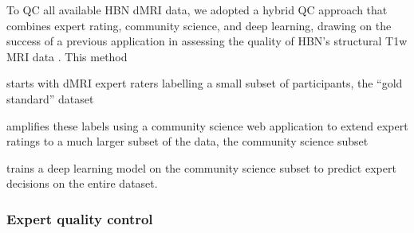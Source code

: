 \documentclass[fleqn,10pt,inline]{wlscirep}
\begin{document}
To QC all available HBN dMRI data, we adopted a hybrid QC approach that
combines expert rating, community science, and deep learning, drawing on the
success of a previous application in assessing the quality of HBN's structural
T1w MRI data \cite{keshavan2019-er}. This method
\begin{enumerate*}[%
    label=(\roman*),%
    before={{ }},%
    itemjoin={{; }},%
    itemjoin*={{ and }}]
    \item starts with dMRI expert raters labelling a small subset of participants,
    the ``gold standard'' dataset
    \item amplifies these labels using a community science web application to
    extend expert ratings to a much larger subset of the data, the community
    science subset
    \item trains a deep learning model on the community science subset to
    predict expert decisions on the entire dataset.
\end{enumerate*}

\subsubsection*{Expert quality control}
\end{document}
